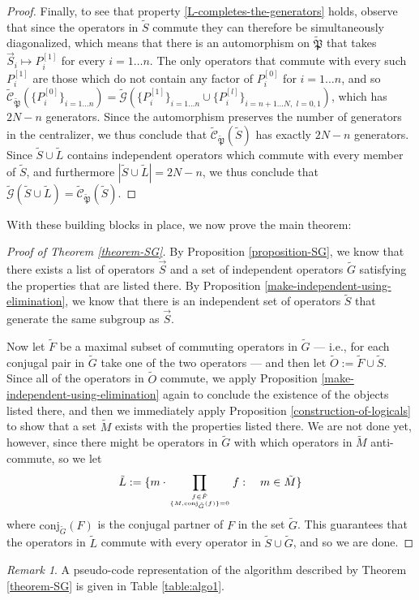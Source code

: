 \documentclass{amsbook}
\theoremstyle{plain}
\theoremstyle{definition}
\theoremstyle{remark}
\newtheorem{remark}{Remark}
\newcommand{\lst}{\vec}
\newcommand{\set}{\tilde}
\newcommand{\genfun}{\tilde{\mathcal{G}}}
\newcommand{\pauligroup}{{\set{\mathfrak{P}}}}
\newcommand{\centralizer}{\set{\mathcal{C}}}
\newcommand{\paren}[1]{\left(#1\right)}
\begin{document}
\begin{proof}
Finally, to see that property \ref{L-completes-the-generators} holds, observe that since the operators in $\set S$ commute they can therefore be simultaneously diagonalized, which means that there is an automorphism on $\pauligroup$ that takes $\lst S_i\mapsto P_i^{[1]}$ for every $i=1 \dots n$.  The only operators that commute with every such $P_i^{[1]}$ are those which do not contain any factor of $P_i^{[0]}$ for $i=1 \dots n$, and so $\centralizer_\pauligroup\paren{\{P_i^{[0]}\}_{i=1\dots n}} = \genfun\paren{\{P_i^{[1]}\}_{i=1 \dots n}\cup \{P_i^{[l]}\}_{i=n+1 \dots N, \,\, l=0,1}}$, which has $2N-n$ generators.  Since the automorphism preserves the number of generators in the centralizer, we thus conclude that $\centralizer_\pauligroup(\set S)$ has exactly $2N-n$ generators.  Since $\set S\cup\set L$ contains independent operators which commute with every member of $\set S$, and furthermore $|\set S\cup\set L|=2N-n$, we thus conclude that $\genfun\paren{\set S\cup\set L}=\centralizer_\pauligroup(\set S)$.
\end{proof}
With these building blocks in place, we now prove the main theorem:

\begin{proof}[Proof of Theorem \ref{theorem-SG}]
By Proposition \ref{proposition-SG}, we know that there exists a list of operators $\lst S$ and a set of independent operators $\set G$ satisfying the properties that are listed there.  By Proposition \ref{make-independent-using-elimination}, we know that there is an independent set of operators $\set S$ that generate the same subgroup as $\lst S$.  

Now let $\set F$ be a maximal subset of commuting operators in $\set G$ --- i.e., for each conjugal pair in $\set G$ take one of the two operators --- and then let $\set O := \set F \cup \set S$.  Since all of the operators in $\set O$ commute, we apply Proposition \ref{make-independent-using-elimination} again to conclude the existence of the objects listed there, and then we immediately apply Proposition \ref{construction-of-logicals} to show that a set $\set M$ exists with the properties listed there.  We are not done yet, however, since there might be operators in $\set G$ with which operators in $\set M$ anti-commute, so we let
$$\set L := \{m\cdot\prod_{f\in \set F\atop \{M,\text{conj}_{\set G}(f)\}=0} f :\quad m \in\set M\}$$
where $\text{conj}_{\set G}(F)$ is the conjugal partner of $F$ in the set $\set G$.  This guarantees that the operators in $\set L$ commute with every operator in $\set S\cup\set G$, and so we are done.
\end{proof}
\begin{remark}
A pseudo-code representation of the algorithm described by Theorem \ref{theorem-SG} is given in Table \ref{table:algo1}.
\end{remark}
\end{document}
